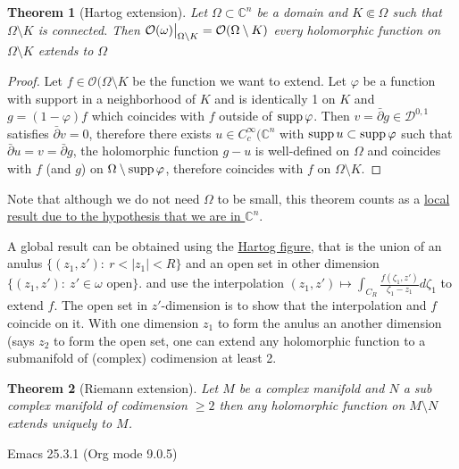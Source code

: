\documentclass[11pt]{article}
\newtheorem{theorem}{Theorem}
\newcommand{\supp}{\mathop{\rm supp}\nolimits}
\newcommand\restr[2]{{%
\left.\kern-\nulldelimiterspace %
#1 %
\vphantom{\big|} %
\right|_{#2} %
}}
\begin{document}
\begin{theorem}[Hartog extension]
\label{thm:hartog-ext}
Let \(\Omega \subset \mathbb{C}^n\) be a domain and \(K \Subset \Omega\) such that \(\Omega\setminus K\) is connected. Then \(\restr{\mathcal{O}(\omega)}{\Omega\setminus K} =
\mathcal{O}(\Omega\setminus K)\) every holomorphic function on \(\Omega\setminus K\) extends to \(\Omega\)
\end{theorem}
\begin{proof}
Let \(f\in \mathcal{O}(\Omega \setminus K\) be the function we want to extend. Let \(\varphi\) be a function with support in a neighborhood of \(K\) and is identically 1 on
\(K\) and \(g = (1-\varphi)f\) which coincides with \(f\) outside of \(\supp
\varphi\). Then \(v = \bar \partial g \in \mathcal{D}^{0,1}\) satisfies \(\bar
\partial v = 0\), therefore there exists \(u\in C_c^\infty(\mathbb{C}^n\) with \(\supp
u \subset \supp \varphi\) such that \(\bar \partial u = v = \bar \partial g\), the
holomorphic function \(g-u\) is well-defined on \(\Omega\) and coincides with \(f\)
(and \(g\)) on \(\Omega\setminus \supp\varphi\), therefore coincides with \(f\) on
\(\Omega\setminus K\).
\end{proof}

Note that although we do not need \(\Omega\) to be small, this theorem counts as a
\uline{local result due to the hypothesis that we are in \(\mathbb{C}^n\)}.


A global result can be obtained using the \href{https://en.wikipedia.org/wiki/Hartogs'\_extension\_theorem}{Hartog figure}, that is the union of an anulus \(\{ (z_1,z'):\ r < |z_1| <
R\}\) and an open set in other dimension \(\{ (z_1,z'):\ z'\in\omega \text{ open}\}\).
and use the interpolation \((z_1,z') \mapsto \int_{C_{R}} \frac{f(\zeta_1,z')}{\zeta_1-z_1}d\zeta_1\) to extend \(f\). The open set in \(z'\)-dimension is to show that the interpolation and \(f\)
coincide on it. With one dimension \(z_1\) to form the anulus an another dimension (says
\(z_2\) to form the open set, one can extend any holomorphic function to a submanifold
of (complex) codimension at least 2.

\begin{theorem}[Riemann extension]
\label{thm:riemann-ext}
Let \(M\) be a complex manifold and \(N\) a sub complex manifold of codimension \(\geq 2\) then any holomorphic function on \(M\setminus N\) extends uniquely to \(M\).
\end{theorem}
Emacs 25.3.1 (Org mode 9.0.5)
\end{document}

